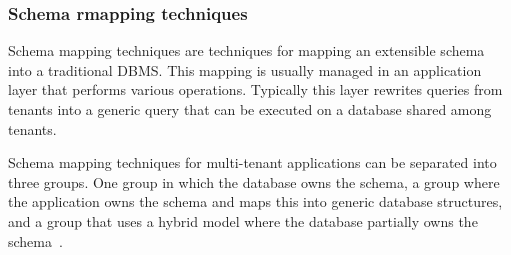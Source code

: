 \subsubsection{Schema rmapping techniques}
Schema mapping techniques are techniques for mapping an extensible schema into a traditional \ac{DBMS}.
This mapping is usually managed in an application layer that performs various operations. 
Typically this layer rewrites queries from tenants into a generic query that can be executed on a database shared among tenants.

Schema mapping techniques for multi-tenant applications can be separated into three groups. 
One group in which the database owns the schema, a group where the application owns the schema and maps this into generic database structures, and a group that uses a hybrid model where the database partially owns the schema~\cite{aulbach2009comparison}.


